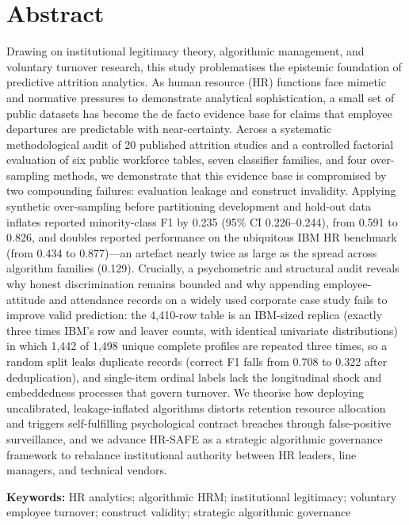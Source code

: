 \documentclass[12pt,a4paper]{article}
\renewenvironment{abstract}{\section*{Abstract}\noindent\ignorespaces}{\par}
\begin{document}
\begin{abstract}
Drawing on institutional legitimacy theory, algorithmic management, and voluntary turnover research, this study problematises the epistemic foundation of predictive attrition analytics. As human resource (HR) functions face mimetic and normative pressures to demonstrate analytical sophistication, a small set of public datasets has become the de facto evidence base for claims that employee departures are predictable with near-certainty. Across a systematic methodological audit of 20 published attrition studies and a controlled factorial evaluation of six public workforce tables, seven classifier families, and four over-sampling methods, we demonstrate that this evidence base is compromised by two compounding failures: evaluation leakage and construct invalidity. Applying synthetic over-sampling before partitioning development and hold-out data inflates reported minority-class F1 by 0.235 (95\% CI 0.226--0.244), from 0.591 to 0.826, and doubles reported performance on the ubiquitous IBM HR benchmark (from 0.434 to 0.877)---an artefact nearly twice as large as the spread across algorithm families (0.129). Crucially, a psychometric and structural audit reveals why honest discrimination remains bounded and why appending employee-attitude and attendance records on a widely used corporate case study fails to improve valid prediction: the 4,410-row table is an IBM-sized replica (exactly three times IBM's row and leaver counts, with identical univariate distributions) in which 1,442 of 1,498 unique complete profiles are repeated three times, so a random split leaks duplicate records (correct F1 falls from 0.708 to 0.322 after deduplication), and single-item ordinal labels lack the longitudinal shock and embeddedness processes that govern turnover. We theorise how deploying uncalibrated, leakage-inflated algorithms distorts retention resource allocation and triggers self-fulfilling psychological contract breaches through false-positive surveillance, and we advance HR-SAFE as a strategic algorithmic governance framework to rebalance institutional authority between HR leaders, line managers, and technical vendors.
\end{abstract}
\noindent\textbf{Keywords:} HR analytics; algorithmic HRM; institutional legitimacy; voluntary employee turnover; construct validity; strategic algorithmic governance

\clearpage
\end{document}
